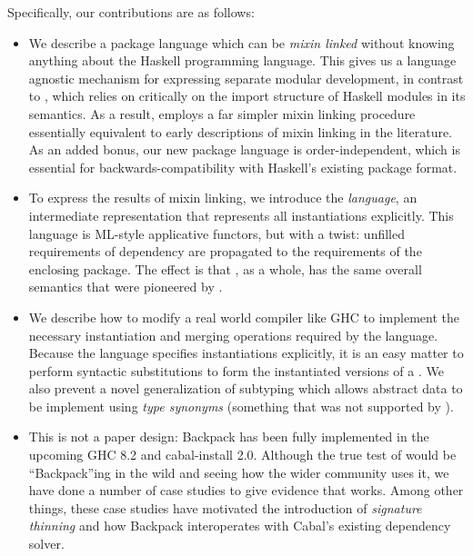 Specifically, our contributions are as follows:
\begin{itemize}

    \item We describe a package language which can be \emph{mixin
    linked} without knowing anything about the Haskell programming
    language.  This gives us a language agnostic mechanism for
    expressing separate modular development, in contrast to
    \OldBackpack{}, which relies on critically on the import structure
    of Haskell modules in its semantics.  As a result, \Backpack{}
    employs a far simpler mixin linking procedure essentially equivalent
    to early descriptions of mixin linking in the literature.  As an
    added bonus, our new package language is order-independent, which is
    essential for backwards-compatibility with Haskell's existing
    package format.

    \item To express the results of mixin linking, we introduce the
    \emph{\unit{} language}, an intermediate representation that
    represents all instantiations explicitly.  This language is
    ML-style applicative functors, but with a twist:
    unfilled requirements of dependency are propagated to the requirements
    of the enclosing package.  The effect is that \Backpack{}, as a
    whole, has the same overall semantics that were pioneered by \OldBackpack{}.

    \item We describe how to modify a real world compiler like GHC to
    implement the necessary instantiation and merging operations
    required by the \unit{} language.  Because the \unit{} language
    specifies instantiations explicitly, it is an easy matter to perform
    syntactic substitutions to form the instantiated versions of a
    \unit{}.  We also prevent a novel generalization of subtyping
    which allows abstract data to be implement using \emph{type
    synonyms} (something that was not supported by \OldBackpack{}).


    \item This is not a paper design: Backpack has been fully
    implemented in the upcoming GHC 8.2 and cabal-install 2.0.  Although
    the true test of \Backpack{} would be
    ``Backpack''ing in the wild and seeing how the wider community
    uses it, we have done a number of case studies to give evidence
    that \Backpack{} works.  Among other things, these case studies
    have motivated the introduction of \emph{signature thinning}
    and how Backpack interoperates with Cabal's existing dependency
    solver.

\end{itemize}
